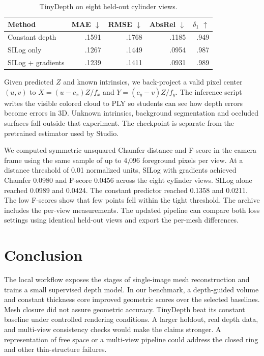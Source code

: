 \documentclass[conference]{IEEEtran}
\begin{document}
\begin{table}[!t]
\caption{TinyDepth on eight held-out cylinder views.}
\label{tab:depth}
\centering\footnotesize
\begin{tabular}{lrrrr}
\toprule
Method & MAE $\downarrow$ & RMSE $\downarrow$ & AbsRel $\downarrow$ & $\delta_1$ $\uparrow$\\
\midrule
Constant depth & .1591 & .1768 & .1185 & .949\\
SILog only & .1267 & .1449 & .0954 & .987\\
SILog + gradients & .1239 & .1411 & .0931 & .989\\
\bottomrule
\end{tabular}
\end{table}

Given predicted $Z$ and known intrinsics, we back-project a valid pixel center $(u,v)$ to $X=(u-c_x)Z/f_x$ and $Y=(c_y-v)Z/f_y$. The inference script writes the visible colored cloud to PLY so students can see how depth errors become errors in 3D. Unknown intrinsics, background segmentation and occluded surfaces fall outside that experiment. The checkpoint is separate from the pretrained estimator used by Studio.

We computed symmetric unsquared Chamfer distance and F-score in the camera frame using the same sample of up to 4,096 foreground pixels per view. At a distance threshold of 0.01 normalized units, SILog with gradients achieved Chamfer 0.0980 and F-score 0.0456 across the eight cylinder views. SILog alone reached 0.0989 and 0.0424. The constant predictor reached 0.1358 and 0.0211. The low F-scores show that few points fell within the tight threshold. The archive includes the per-view measurements. The updated pipeline can compare both loss settings using identical held-out views and export the per-mesh differences.

\balance
\section{Conclusion}
The local workflow exposes the stages of single-image mesh reconstruction and trains a small supervised depth model. In our benchmark, a depth-guided volume and constant thickness core improved geometric scores over the selected baselines. Mesh closure did not assure geometric accuracy. TinyDepth beat its constant baseline under controlled rendering conditions. A larger holdout, real depth data, and multi-view consistency checks would make the claims stronger. A representation of free space or a multi-view pipeline could address the closed ring and other thin-structure failures.
\end{document}

